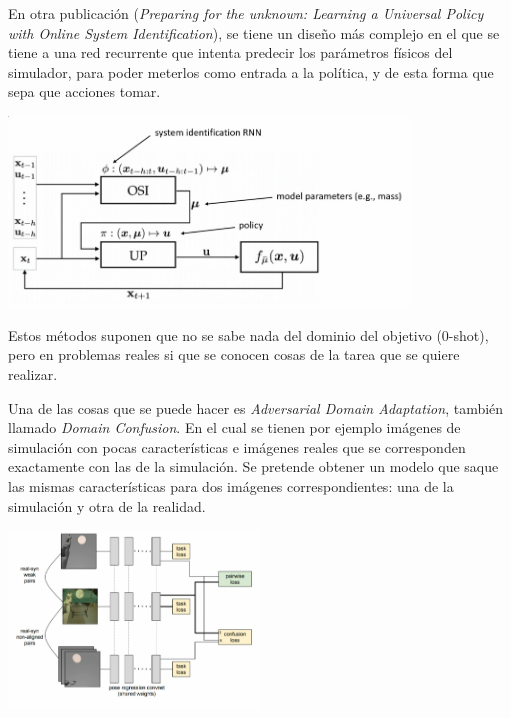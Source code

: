 En otra publicación (\textit{Preparing for the unknown: Learning a Universal Policy with Online
System Identification}), se tiene un diseño más complejo en el que se tiene a una red recurrente
que intenta predecir los parámetros físicos del simulador, para poder meterlos como
entrada a la política, y de esta forma que sepa que acciones tomar.

\begin{center}
\includegraphics[width=0.8\textwidth]{figures/2020-07-12-185327_841x399_scrot.png}
\end{center}

Estos métodos suponen que no se sabe nada del dominio del objetivo (0-shot), pero en problemas reales si
que se conocen cosas de la tarea que se quiere realizar.

Una de las cosas que se puede hacer es \textit{Adversarial Domain Adaptation}, también
llamado \textit{Domain Confusion}. En el cual se tienen por ejemplo imágenes de simulación con
pocas características e imágenes reales que se corresponden exactamente con las de la
simulación. Se pretende obtener un modelo que saque las mismas características para
dos imágenes correspondientes: una de la simulación y otra de la realidad.

\begin{center}
\includegraphics[width=0.5\textwidth]{figures/2020-07-12-190707_561x400_scrot.png}
\end{center}


